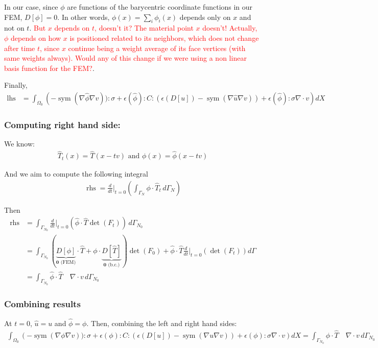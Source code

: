 \documentclass[11pt]{article}
\DeclareMathOperator{\sym}{sym}
\DeclareMathOperator{\lhs}{lhs}
\DeclareMathOperator{\rhs}{rhs}
\begin{document}
In our case, since $\phi$ are functions of the barycentric coordinate functions in our FEM, $D[\phi] = 0$. In other words, $\phi(x) = \sum_i \phi_i(x)$ depends only on $x$ and not on $t$. \textcolor{red}{But $x$ depends on $t$, doesn't it? The material point $x$ doesn't! Actually, $\phi$ depends on how $x$ is positioned related to its neighbors, which does not change after time $t$, since $x$ continue being a weight average of its face vertices (with same weights always). Would any of this change if we were using a non linear basis function for the FEM?}.

Finally,
\begin{align*}
  \lhs &= \int_{\Omega_0} \left(- \sym(\nabla \hat \phi \nabla v)):\sigma + \epsilon(\hat \phi):C:(\epsilon(D[ u])  - \sym(\nabla \hat u \nabla v)) + \epsilon(\hat \phi): \sigma \nabla \cdot v \right) dX
\end{align*}

\subsubsection{Computing right hand side:}
We know:
\begin{align*}
  \hat T_t(x) = \hat T(x - tv) \text{ and } \phi(x) = \hat \phi(x - tv)  
\end{align*}

And we aim to compute the following integral
\begin{align*}
  \rhs = \frac{d}{dt} \Big|_{t=0} \left( \int_{\Gamma_N} \phi \cdot \hat T_t\, d\Gamma_N\right)
\end{align*} 

Then
\begin{align*}
  \rhs &= \int_{\Gamma_{N_0}} \frac{d}{dt} \Big|_{t=0} \left(\hat \phi \cdot \hat T \det(F_t) \right)\, d\Gamma_{N_0}\\
  &= \int_{\Gamma_{N_0}} ( \underbrace{D[\phi]}_{\textbf{0} \text{ (FEM)}} \cdot \hat T + \phi \cdot \underbrace{D[\hat T]}_{\textbf{0} \text{ (b.c.)}} ) \det(F_0) + \hat \phi \cdot \hat T \frac{d}{dt} \Big|_{t=0}\left(\det(F_t)\right) d\Gamma \\
  &= \int_{\Gamma_{N_0}} \hat \phi \cdot \hat T \quad \nabla \cdot v\, d\Gamma_{N_0}
\end{align*}

\subsubsection{Combining results}
At $t=0$, $\hat u = u$ and $\hat \phi = \phi$. Then, combining the left and right hand sides:
\begin{align*}
  \int_{\Omega_0} \left(- \sym(\nabla \phi \nabla v)):\sigma + \epsilon(\phi):C:(\epsilon(D[u])  - \sym(\nabla u \nabla v)) + \epsilon(\phi): \sigma \nabla \cdot v \right) dX = \int_{\Gamma_{N_0}} \phi \cdot \hat T \quad \nabla \cdot v\, d\Gamma_{N_0}
\end{align*}
\end{document}
